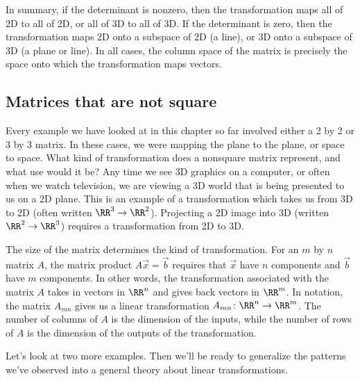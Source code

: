 In summary, if the determinant is nonzero, then the transformation maps all of 2D to all of 2D, or all of 3D to all of 3D.  If the determinant is zero, then the transformation maps 2D onto a subspace of 2D (a line), or 3D onto a subspace of 3D (a plane or line).  In all cases, the column space of the matrix is precisely the space onto which the transformation maps vectors.

\subsection{Matrices that are not square}

Every example we have looked at in this chapter so far involved either a 2 by 2 or 3 by 3 matrix.  In these cases, we were mapping the plane to the plane, or space to space.  What kind of transformation does a nonsquare matrix represent, and what use would it be?  Any time we see 3D graphics on a computer, or often when we watch television, we are viewing a 3D world that is being presented to us on a 2D plane.  This is an example of a transformation which takes us from 3D to 2D (often written $\RR^3\to \RR^2$).  Projecting a 2D image into 3D (written $\RR^2\to \RR^3$) requires a transformation from 2D to 3D.

The size of the matrix determines the kind of transformation.  For an $m$ by $n$ matrix $A$, the matrix product $A\vec x = \vec b$ requires that $\vec x$ have $n$ components and $\vec b$ have $m$ components.  In other words, the transformation associated with the matrix $A$ takes in vectors in $\RR^n$ and gives back vectors in $\RR^m$.  In notation, the matrix $A_{mn}$ gives us a linear transformation $A_{mn}\colon \RR^n\to \RR^m$.  The number of columns of $A$ is the dimension of the inputs, while the number of rows of $A$ is the dimension of the outputs of the transformation.

Let's look at two more examples.  Then we'll be ready to generalize the patterns we've observed into a general theory about linear transformations.

